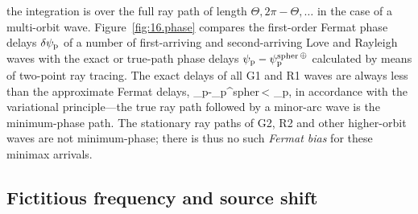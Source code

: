 the integration is over the full ray path of length $\Theta,
2\pi-\Theta,\ldots$ in the case of a multi-orbit wave.
Figure~\ref{fig:16.phase} compares the first-order
Fermat phase delays $\delta\psi_{\rm p}$ of a
number of first-arriving and second-arriving Love and
Rayleigh waves with the exact or true-path phase delays
$\psi_{\rm p}-\psi_{\rm p}^{\rm spher\,\subearth}$
calculated by means of two-point ray tracing.
The exact delays of all G1 and R1 waves
are always less than the approximate Fermat delays,
\eq
\psi_{\rm p}-\psi_{\rm p}^{\rm spher\,\subearth}<
\delta\psi_{\rm p},
\en
in accordance with the variational principle---the true
ray path followed
by a minor-arc wave is the minimum-phase path.
The stationary ray paths of G2, R2 and other
higher-orbit waves are not minimum-phase; there is thus
no such {\em Fermat bias\/} for these minimax arrivals.
%
%

\subsection{Fictitious frequency and source shift}
%
%
\label{16.sec.WDGC}

